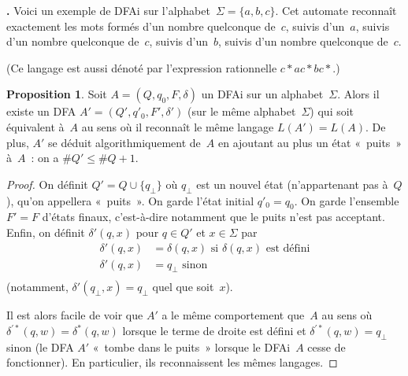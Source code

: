 \documentclass[12pt,a4paper]{article}
\theoremstyle{definition}
\newcommand\thingy{%
\refstepcounter{comcnt}\medskip\noindent\textbf{\thecomcnt.} }
\newtheorem{prop}[comcnt]{Proposition}
\begin{document}
\thingy\label{discussion-example2b} Voici un exemple de DFAi sur
l'alphabet $\Sigma = \{a,b,c\}$.  Cet automate reconnaît exactement
les mots formés d'un nombre quelconque de $c$, suivis d'un $a$, suivis
d'un nombre quelconque de $c$, suivis d'un $b$, suivis d'un nombre
quelconque de $c$.

\begin{center}


\end{center}

(Ce langage est aussi dénoté par l'expression rationnelle
$c{*}ac{*}bc{*}$.)

\begin{prop}\label{completion-of-dfai}
Soit $A = (Q,q_0,F,\delta)$ un DFAi sur un alphabet $\Sigma$.  Alors
il existe un DFA $A' = (Q',q'_0,F',\delta')$ (sur le même
alphabet $\Sigma$) qui soit équivalent à $A$ au sens où il reconnaît
le même langage $L(A') = L(A)$.  De plus, $A'$ se déduit
algorithmiquement de $A$ en ajoutant au plus un état « puits » à $A$ :
on a $\#Q' \leq \#Q + 1$.
\end{prop}
\begin{proof}
On définit $Q' = Q \cup \{q_\bot\}$ où $q_\bot$ est un nouvel état
(n'appartenant pas à $Q$), qu'on appellera « puits ».  On garde l'état
initial $q'_0 = q_0$.  On garde l'ensemble $F' = F$ d'états finaux,
c'est-à-dire notamment que le puits n'est pas acceptant.  Enfin, on
définit $\delta'(q,x)$ pour $q\in Q'$ et $x\in\Sigma$ par
\[
\begin{aligned}
\delta'(q,x) &= \delta(q,x)\text{ si $\delta(q,x)$ est défini}\\
\delta'(q,x) &= q_\bot\text{ sinon}\\
\end{aligned}
\]
(notamment, $\delta'(q_\bot,x) = q_\bot$ quel que soit $x$).

Il est alors facile de voir que $A'$ a le même comportement que $A$ au
sens où $\delta^{\prime*}(q,w) = \delta^*(q,w)$ lorsque le terme de
droite est défini et $\delta^{\prime*}(q,w) = q_\bot$ sinon (le DFA
$A'$ « tombe dans le puits » lorsque le DFAi $A$ cesse de
fonctionner).  En particulier, ils reconnaissent les mêmes langages.
\end{proof}
\end{document}

